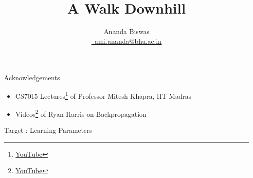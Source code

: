 \documentclass[10pt, aspectratio=169]{beamer}
\title{A Walk Downhill}
\author[\href{mailto:ami.ananda@bhu.ac.in}{\faEnvelope \, ami.ananda@bhu.ac.in}]{Ananda Biswas \\[0.5em] \href{mailto:ami.ananda@bhu.ac.in}{\faEnvelope \, ami.ananda@bhu.ac.in}}
\date{}
\begin{document}
\begin{frame}
	\titlepage
\end{frame}

\begin{frame}
	\begin{block}{Acknowledgements}
		\begin{itemize}
		\item CS7015 Lectures\footnote{\href{https://www.youtube.com/playlist?list=PLyqSpQzTE6M9gCgajvQbc68Hk_JKGBAYT}{YouTube}} of Professor Mitesh Khapra, IIT Madras \\[0.75em]
		\item Videos\footnote{\href{https://www.youtube.com/playlist?list=PLEAYkSg4uSQ2WG11drrwV6Igj360RaxK9}{YouTube}} of Ryan Harris on Backpropagation
		\end{itemize}			
	\end{block}
\end{frame}


\begin{frame}{Target : Learning Parameters}
\centering
{}
\end{frame}
\end{document}
